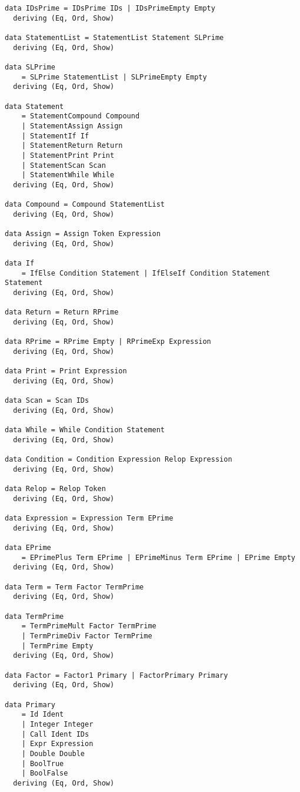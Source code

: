 \documentclass[11pt]{article}
\begin{document}
\begin{verbatim}
data IDsPrime = IDsPrime IDs | IDsPrimeEmpty Empty
  deriving (Eq, Ord, Show)

data StatementList = StatementList Statement SLPrime
  deriving (Eq, Ord, Show)

data SLPrime
    = SLPrime StatementList | SLPrimeEmpty Empty
  deriving (Eq, Ord, Show)

data Statement
    = StatementCompound Compound
    | StatementAssign Assign
    | StatementIf If
    | StatementReturn Return
    | StatementPrint Print
    | StatementScan Scan
    | StatementWhile While
  deriving (Eq, Ord, Show)

data Compound = Compound StatementList
  deriving (Eq, Ord, Show)

data Assign = Assign Token Expression
  deriving (Eq, Ord, Show)

data If
    = IfElse Condition Statement | IfElseIf Condition Statement Statement
  deriving (Eq, Ord, Show)

data Return = Return RPrime
  deriving (Eq, Ord, Show)

data RPrime = RPrime Empty | RPrimeExp Expression
  deriving (Eq, Ord, Show)

data Print = Print Expression
  deriving (Eq, Ord, Show)

data Scan = Scan IDs
  deriving (Eq, Ord, Show)

data While = While Condition Statement
  deriving (Eq, Ord, Show)

data Condition = Condition Expression Relop Expression
  deriving (Eq, Ord, Show)

data Relop = Relop Token
  deriving (Eq, Ord, Show)

data Expression = Expression Term EPrime
  deriving (Eq, Ord, Show)

data EPrime
    = EPrimePlus Term EPrime | EPrimeMinus Term EPrime | EPrime Empty
  deriving (Eq, Ord, Show)

data Term = Term Factor TermPrime
  deriving (Eq, Ord, Show)

data TermPrime
    = TermPrimeMult Factor TermPrime
    | TermPrimeDiv Factor TermPrime
    | TermPrime Empty
  deriving (Eq, Ord, Show)

data Factor = Factor1 Primary | FactorPrimary Primary
  deriving (Eq, Ord, Show)

data Primary
    = Id Ident
    | Integer Integer
    | Call Ident IDs
    | Expr Expression
    | Double Double
    | BoolTrue
    | BoolFalse
  deriving (Eq, Ord, Show)
\end{verbatim}
\end{document}
